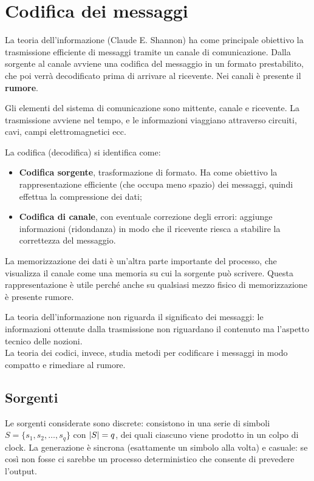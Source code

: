 \section{Codifica dei messaggi}
La teoria dell'informazione (Claude E. Shannon) ha come principale obiettivo la trasmissione efficiente di messaggi tramite un canale di comunicazione. Dalla sorgente al canale avviene una codifica del messaggio in un formato prestabilito, che poi verrà decodificato prima di arrivare al ricevente. Nei canali è presente il \textbf{rumore}.

Gli elementi del sistema di comunicazione sono mittente, canale e ricevente. La trasmissione avviene nel tempo, e le informazioni viaggiano attraverso circuiti, cavi, campi elettromagnetici ecc.

La codifica (decodifica) si identifica come:
\begin{itemize}
	\item \textbf{Codifica sorgente}, trasformazione di formato. Ha come obiettivo la rappresentazione efficiente (che occupa meno spazio) dei messaggi, quindi effettua la compressione dei dati;
	\item \textbf{Codifica di canale}, con eventuale correzione degli errori: aggiunge informazioni (ridondanza) in modo che il ricevente riesca a stabilire la correttezza del messaggio.
\end{itemize}

La memorizzazione dei dati è un'altra parte importante del processo, che visualizza il canale come una memoria su cui la sorgente può scrivere. Questa rappresentazione è utile perché anche su qualsiasi mezzo fisico di memorizzazione è presente rumore. 

La teoria dell'informazione non riguarda il significato dei messaggi: le informazioni ottenute dalla trasmissione non riguardano il contenuto ma l'aspetto tecnico delle nozioni. \\
La teoria dei codici, invece, studia metodi per codificare i messaggi in modo compatto e rimediare al rumore.

\subsection{Sorgenti}
Le sorgenti considerate sono discrete: consistono in una serie di simboli $S = \{s_1, s_2, \dots, s_q\}$ con $\left|S\right| = q$, dei quali ciascuno viene prodotto in un colpo di clock. La generazione è sincrona (esattamente un simbolo alla volta) e casuale: se così non fosse ci sarebbe un processo deterministico che consente di prevedere l'output.

